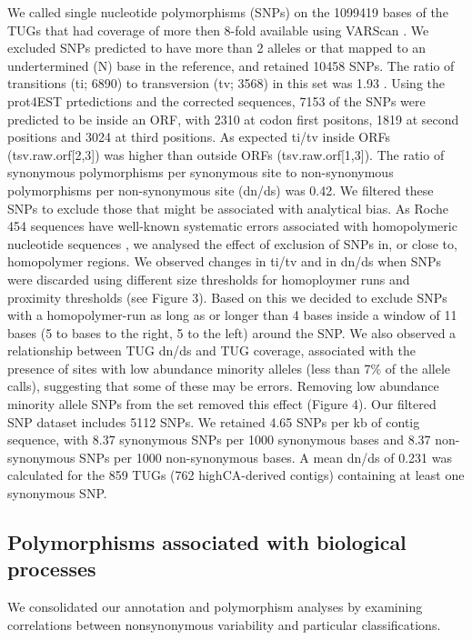 \documentclass[10pt]{bmc_article}
\newenvironment{bmcformat}{\begin{raggedright}\baselineskip20pt\sloppy\setboolean{publ}{false}}{\end{raggedright}\baselineskip20pt\sloppy}
\begin{document}
\begin{bmcformat}
We called single nucleotide polymorphisms (SNPs) on the
1099419 bases of the TUGs that had coverage of more then
8-fold available using VARScan \cite{pmid19542151}. We excluded SNPs
predicted to have more than 2 alleles or that mapped to an
undertermined (N) base in the reference, and retained
10458 SNPs. The ratio of transitions (ti;
6890) to transversion (tv;
3568) in this set was
1.93 . Using the prot4EST
prtedictions and the corrected sequences, 7153 of
the SNPs were predicted to be inside an ORF, with
2310 at codon first positons, 1819
at second positions and 3024 at third positions. As
expected ti/tv inside ORFs (tsv.raw.orf[2,3]) was higher than outside
ORFs (tsv.raw.orf[1,3]). The ratio of synonymous polymorphisms per
synonymous site to non-synonymous polymorphisms per non-synonymous
site (dn/ds) was 0.42. We filtered these SNPs to exclude
those that might be associated with analytical bias. As Roche 454
sequences have well-known systematic errors associated with
homopolymeric nucleotide sequences \cite{pmid21685085}, we analysed
the effect of exclusion of SNPs in, or close to, homopolymer
regions. We observed changes in ti/tv and in dn/ds when SNPs were
discarded using different size thresholds for homoploymer runs and
proximity thresholds (see Figure 3). Based on this we decided to
exclude SNPs with a homopolymer-run as long as or longer than 4 bases
inside a window of 11 bases (5 to bases to the right, 5 to the left)
around the SNP. We also observed a relationship between TUG dn/ds and
TUG coverage, associated with the presence of sites with low abundance
minority alleles (less than 7\% of the allele calls), suggesting that
some of these may be errors.  Removing low abundance minority allele
SNPs from the set removed this effect (Figure 4).  Our filtered SNP
dataset includes 5112 SNPs. We retained
4.65 SNPs per kb of contig sequence, with
8.37 synonymous SNPs per 1000 synonymous bases and
8.37 non-synonymous SNPs per 1000 non-synonymous
bases. A mean dn/ds of 0.231 was
calculated for the 859 TUGs
(762 highCA-derived contigs)
containing at least one synonymous SNP.

\subsection*{Polymorphisms associated with biological processes}

We consolidated our annotation and polymorphism analyses by examining
correlations between nonsynonymous variability and particular
classifications.


\end{bmcformat}
\end{document}
